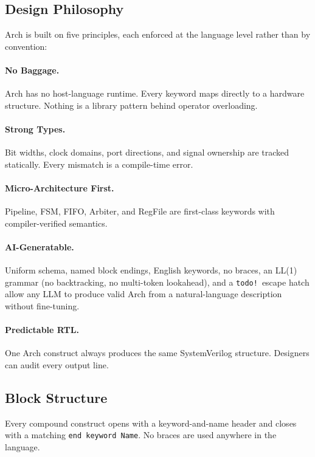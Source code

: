 \documentclass[11pt,twocolumn]{article}
\begin{document}
\subsection{Design Philosophy}

Arch is built on five principles, each enforced at the language level rather than by convention:

\paragraph{No Baggage.} Arch has no host-language runtime. Every keyword maps directly to a hardware structure. Nothing is a library pattern behind operator overloading.

\paragraph{Strong Types.} Bit widths, clock domains, port directions, and signal ownership are tracked statically. Every mismatch is a compile-time error.

\paragraph{Micro-Architecture First.} Pipeline, FSM, FIFO, Arbiter, and RegFile are first-class keywords with compiler-verified semantics.

\paragraph{AI-Generatable.} Uniform schema, named block endings, English keywords, no braces, an LL(1) grammar (no backtracking, no multi-token lookahead), and a \texttt{todo!}\ escape hatch allow any LLM to produce valid Arch from a natural-language description without fine-tuning.

\paragraph{Predictable RTL.} One Arch construct always produces the same SystemVerilog structure. Designers can audit every output line.

\subsection{Block Structure}

Every compound construct opens with a keyword-and-name header and closes with a matching \texttt{end keyword Name}. No braces are used anywhere in the language.
\end{document}
